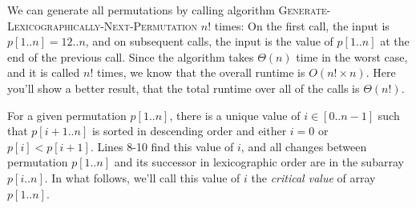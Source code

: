 \documentclass[11pt]{article}
\begin{document}
We can generate all permutations by calling
algorithm \textsc{Generate-Lexicographically-Next-Permutation}
$n!$ times: On the first call, the input is $p[1..n] = 12..n$, and on subsequent calls, the input is the value of $p[1..n]$ at the end of the previous call. Since the algorithm takes $\Theta(n)$ time in the worst case, and it is called $n!$ times, we know that the overall runtime is $O(n! \times n)$. Here you'll show a better result, that the total runtime over all of the calls is $\Theta(n!)$.

For a given permutation $p[1..n]$, there is a unique value
of $i \in [0..n-1]$ such that
$p[i+1..n]$ is sorted in descending order and either $i=0$ or $p[i] < p[i+1]$.
Lines 8-10 find this value of $i$, and all changes between permutation $p[1..n]$ and its successor in lexicographic order are in the subarray $p[i..n]$.
In what follows, we'll call this value of $i$ the {\em critical value} of array $p[1..n]$.
\end{document}
